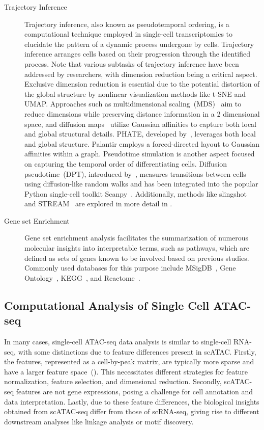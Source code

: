 \begin{description}
	\item[Trajectory Inference]
	Trajectory inference, also known as pseudotemporal ordering, is a computational technique employed in single-cell transcriptomics to elucidate the pattern of a dynamic process undergone by cells. Trajectory inference arranges cells based on their progression through the identified process. Note that various subtasks of trajectory inference have been addressed by researchers, with dimension reduction being a critical aspect. Exclusive dimension reduction is essential due to the potential distortion of the global structure by nonlinear visualization methods like t-SNE and UMAP. Approaches such as multidimensional scaling~(MDS)~\citep{torgerson1952multidimensional} aim to reduce dimensions while preserving distance information in a 2 dimensional space, and diffusion maps~\citep{coifman2006diffusion} utilize Gaussian affinities to capture both local and global structural details. PHATE, developed by~\cite{moon2017phate}, leverages both local and global structure. Palantir employs a forced-directed layout to Gaussian affinities within a graph. Pseudotime simulation is another aspect focused on capturing the temporal order of differentiating cells. Diffusion pseudotime~(DPT), introduced by~\citep{haghverdi2016dpt}, measures transitions between cells using diffusion-like random walks and has been integrated into the popular Python single-cell toolkit Scanpy~\citep{wolf2018scanpy}. Additionally, methods like slingshot~\citep{street2018slingshot} and STREAM~\citep{chen2019stream} are explored in more detail in .

	\item[Gene set Enrichment]
	Gene set enrichment analysis facilitates the summarization of numerous molecular insights into interpretable terms, such as pathways, which are defined as sets of genes known to be involved based on previous studies. Commonly used databases for this purpose include MSigDB~\citep{liberzon2011msigdb}, Gene Ontology~\citep{gene2004go}, KEGG~\citep{kanehisa2007kegg}, and Reactome~\citep{fabregat2018reactome}.
\end{description}

\subsection{Computational Analysis of Single Cell ATAC-seq}
\label{background:sec2:scATAC}
In many cases, single-cell ATAC-seq data analysis is similar to single-cell RNA-seq, with some distinctions due to feature differences present in scATAC. Firstly, the features, represented as a cell-by-peak matrix, are typically more sparse and have a larger feature space~(). This necessitates different strategies for feature normalization, feature selection, and dimensional reduction. Secondly, scATAC-seq features are not gene expressions, posing a challenge for cell annotation and data interpretation. Lastly, due to these feature differences, the biological insights obtained from scATAC-seq differ from those of scRNA-seq, giving rise to different downstream analyses like linkage analysis or motif discovery.

